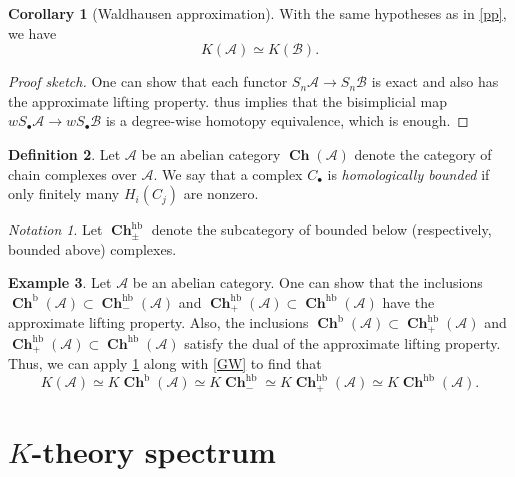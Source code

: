 \documentclass[10pt,letterpaper,cm]{nupset}
\theoremstyle{definition}
\newtheorem{definition}{Definition}[section]
\newtheorem{exmp}[definition]{Example}
\theoremstyle{theorem}
\newtheorem{corollary}[definition]{Corollary}
\theoremstyle{remark}
\newtheorem*{notation}{Notation}
\newcommand{\1}{\mathbf{1}}
\renewcommand{\a}{\mathscr{A}}
\renewcommand{\b}{\mathscr{B}}
\newcommand{\0}{\vec 0}
\DeclareMathOperator{\hb}{hb}
\DeclareMathOperator{\bo}{b}
\DeclareMathOperator{\ch}{\mathbf{Ch}}
\begin{document}
\begin{corollary}[Waldhausen approximation]\label{approx}
With the same hypotheses as in \cref{pp}, we have $$K(\a) \simeq K(\b).$$
\end{corollary}
\begin{proof}[Proof sketch]
One can show that each functor $S_n \a \to S_n \b$ is exact and also has the approximate lifting property.   thus implies that the bisimplicial map $wS_{\bullet}\a \to wS_{\bullet} \b$ is a degree-wise homotopy equivalence, which is enough. 
\end{proof}

\smallskip

\begin{definition}
Let $\a$ be an abelian category $\ch(\a)$ denote the category of chain complexes over $\a$. We say that a complex $C_{\bullet}$ is \textit{homologically bounded} if only finitely many $H_i(C_j)$ are nonzero. 
\end{definition}

\begin{notation}
Let $\ch_{\pm}^{\hb}$ denote the subcategory of bounded below (respectively, bounded above) complexes. 
\end{notation}

\begin{exmp}
Let $\a$ be an abelian category. One can show that the inclusions $\ch^{\bo}(\a) \subset \ch_{-}^{\hb}(\a)$ and $\ch_+^{\hb}(\a)\subset \ch^{\hb}(\a)$ have the approximate lifting property. Also, the inclusions $\ch^{\bo}(\a) \subset \ch_+^{\hb}(\a)$ and $\ch_+^{\hb}(\a)\subset \ch^{\hb}(\a)$ satisfy the dual of the approximate lifting property. Thus, we can apply \cref{approx} along with \cref{GW} to find that $$  K(\a) \simeq K\ch^{\bo}(\a) \simeq  K\ch_{-}^{\hb}\simeq K\ch_{+}^{\hb}(\a) \simeq K \ch^{\hb}(\a).$$
\end{exmp}

\section{$K$-theory spectrum}
\end{document}
